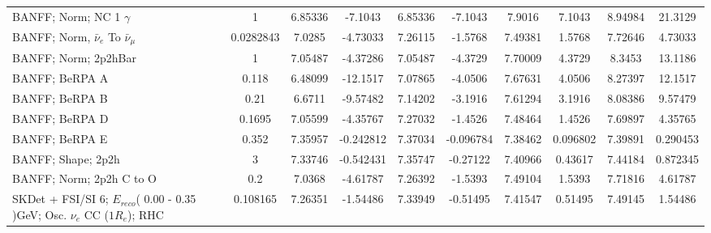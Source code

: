 \begin{tabular}{| l | S | S  S | S  S | S  S | S  S | }
                                                      BANFF; Norm; NC 1 $\gamma$ &               1 &         6.85336 &         -7.1043 &         6.85336 &         -7.1043 &          7.9016 &          7.1043 &         8.94984 &         21.3129 \\ 
                               BANFF; Norm, $\bar{\nu}_{e}$ To $\bar{\nu}_{\mu}$ &       0.0282843 &          7.0285 &        -4.73033 &         7.26115 &         -1.5768 &         7.49381 &          1.5768 &         7.72646 &         4.73033 \\ 
                                                            BANFF; Norm; 2p2hBar &               1 &         7.05487 &        -4.37286 &         7.05487 &         -4.3729 &         7.70009 &          4.3729 &          8.3453 &         13.1186 \\ 
                                                                  BANFF; BeRPA A &           0.118 &         6.48099 &        -12.1517 &         7.07865 &         -4.0506 &         7.67631 &          4.0506 &         8.27397 &         12.1517 \\ 
                                                                  BANFF; BeRPA B &            0.21 &          6.6711 &        -9.57482 &         7.14202 &         -3.1916 &         7.61294 &          3.1916 &         8.08386 &         9.57479 \\ 
                                                                  BANFF; BeRPA D &          0.1695 &         7.05599 &        -4.35767 &         7.27032 &         -1.4526 &         7.48464 &          1.4526 &         7.69897 &         4.35765 \\ 
                                                                  BANFF; BeRPA E &           0.352 &         7.35957 &       -0.242812 &         7.37034 &       -0.096784 &         7.38462 &        0.096802 &         7.39891 &        0.290453 \\ 
                                                              BANFF; Shape; 2p2h &               3 &         7.33746 &       -0.542431 &         7.35747 &        -0.27122 &         7.40966 &         0.43617 &         7.44184 &        0.872345 \\ 
                                                        BANFF; Norm; 2p2h C to O &             0.2 &          7.0368 &        -4.61787 &         7.26392 &         -1.5393 &         7.49104 &          1.5393 &         7.71816 &         4.61787 \\ 
SKDet + FSI/SI  6; $E_{reco}$( 0.00 - 0.35 )GeV; Osc. $\nu_{e}$ CC ($1R_{e}$); RHC &        0.108165 &         7.26351 &        -1.54486 &         7.33949 &        -0.51495 &         7.41547 &         0.51495 &         7.49145 &         1.54486 \\ 

\end{tabular}
